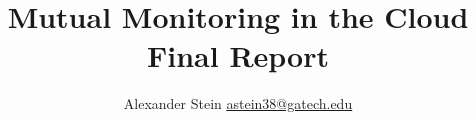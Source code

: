 \documentclass{jdf}
\begin{document}
\title{Mutual Monitoring in the Cloud \\ Final Report}
\author{Alexander Stein \hyperlink{mailto:astein38@gatech.edu}{astein38@gatech.edu}}

\maketitle
\thispagestyle{fancy}
\end{document}
